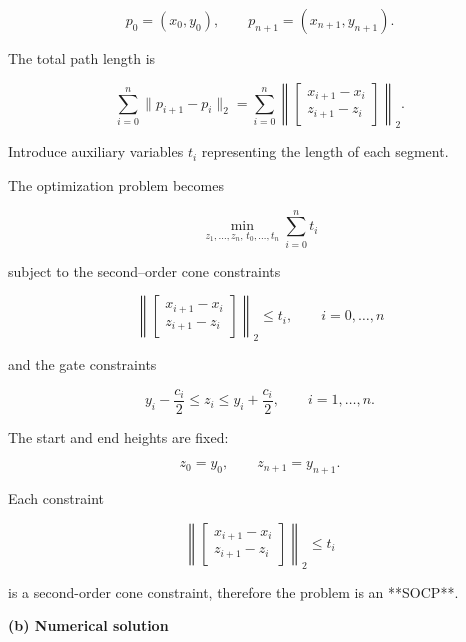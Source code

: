 \documentclass[
	12pt,
]{fphw}
\begin{document}
\[
p_0 = (x_0,y_0), \qquad p_{n+1}=(x_{n+1},y_{n+1}).
\]

The total path length is

\[
\sum_{i=0}^{n} \|p_{i+1}-p_i\|_2
=
\sum_{i=0}^{n}
\left\|
\begin{bmatrix}
x_{i+1}-x_i \\
z_{i+1}-z_i
\end{bmatrix}
\right\|_2.
\]

Introduce auxiliary variables \(t_i\) representing the length of each segment.

The optimization problem becomes

\[
\min_{z_1,\dots,z_n,\,t_0,\dots,t_n}
\sum_{i=0}^{n} t_i
\]

subject to the second–order cone constraints

\[
\left\|
\begin{bmatrix}
x_{i+1}-x_i \\
z_{i+1}-z_i
\end{bmatrix}
\right\|_2
\le t_i,
\qquad i=0,\dots,n
\]

and the gate constraints

\[
y_i - \frac{c_i}{2} \le z_i \le y_i + \frac{c_i}{2},
\qquad i=1,\dots,n.
\]

The start and end heights are fixed:

\[
z_0 = y_0, \qquad z_{n+1}=y_{n+1}.
\]

Each constraint

\[
\left\|
\begin{bmatrix}
x_{i+1}-x_i \\
z_{i+1}-z_i
\end{bmatrix}
\right\|_2
\le t_i
\]

is a second-order cone constraint, therefore the problem is an **SOCP**.

\bigskip

\textbf{(b) Numerical solution}
\end{document}
